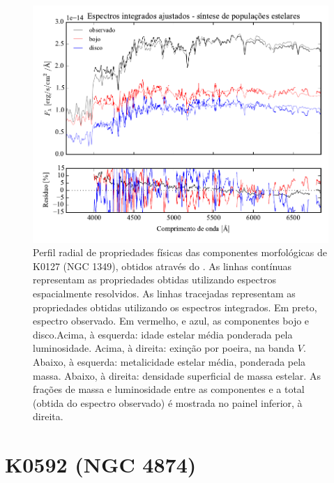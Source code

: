 \begin{figure}
	\includegraphics[page=4]{figuras/sample006a_synthesis}
	\caption[Propriedades físicas das componentes morfológicas de K0127 (NGC 1349)]
	{Perfil radial de propriedades físicas das componentes morfológicas de
	K0127 (NGC 1349), obtidos através do \starlight. As linhas contínuas
	representam as propriedades obtidas utilizando espectros espacialmente
	resolvidos. As linhas tracejadas representam as propriedades obtidas utilizando
	os espectros integrados. Em preto, espectro observado. Em vermelho, e azul, as
	componentes bojo e disco.Acima, à esquerda: idade estelar média ponderada pela
	luminosidade. Acima, à direita: exinção por poeira, na banda $V$. Abaixo, à
	esquerda: metalicidade estelar média, ponderada pela massa. Abaixo, à direita:
	densidade superficial de massa estelar. As frações de massa e luminosidade
	entre as componentes e a total (obtida do espectro observado) é mostrada no
	painel inferior, à direita.}
	\label{fig:decompSinteseRadprof:K0127}
\end{figure}


\section{K0592 (NGC 4874)}
\label{apendice:Decomp:K0592}

